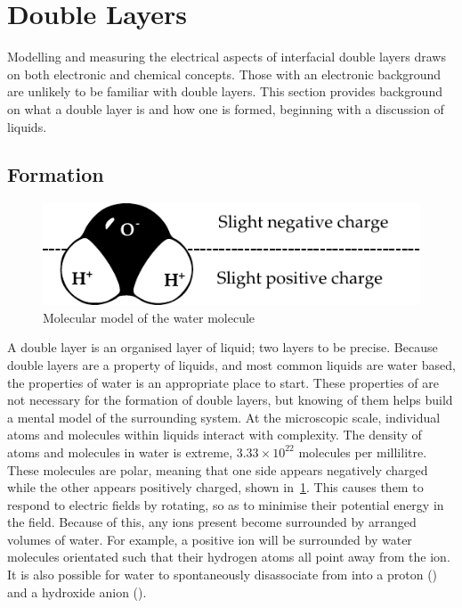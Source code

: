

\section{Double Layers}
  \label{sect:background_doubleLayers}


  Modelling and measuring the electrical aspects of interfacial double layers draws on both electronic and chemical concepts.
  Those with an electronic background are unlikely to be familiar with double layers.
  This section provides background on what a double layer is and how one is formed, beginning with a discussion of liquids.


  \subsection{Formation}
    \label{sub:background_doubleLayers_formation}


    \begin{figure}
        \begin{center}
            \includegraphics{content/introduction/graphics/polarWater}
        \end{center}
        \caption{Molecular model of the water molecule}
        \label{fig:waterMolecule}
    \end{figure}
    A double layer is an organised layer of liquid; two layers to be precise.
    Because double layers are a property of liquids, and most common liquids are water based, the properties of water is an appropriate place to start.
    These properties of are not necessary for the formation of double layers, but knowing of them helps build a mental model of the surrounding system.
    At the microscopic scale, individual atoms and molecules within liquids interact with complexity.
    The density of atoms and molecules in water is extreme, $3.33\times10^{22}$  molecules per millilitre.
    These molecules are polar, meaning that one side appears negatively charged while the other appears positively charged, shown in~\cref{fig:waterMolecule}.
    This causes them to respond to electric fields by rotating, so as to minimise their potential energy in the field.
    Because of this, any ions present become surrounded by arranged volumes of water.
    For example, a positive ion will be surrounded by water molecules orientated such that their hydrogen atoms all point away from the ion.
    It is also possible for water to spontaneously disassociate from  into a proton () and a hydroxide anion  ().


